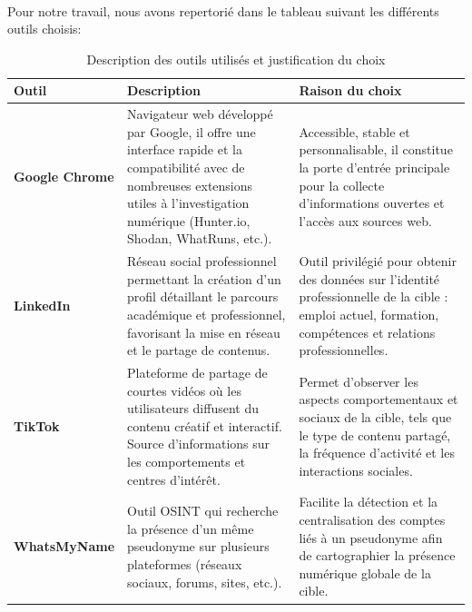 \documentclass[memoire,12pt]{report}
\begin{document}
\paragraph{}Pour notre travail, nous avons repertorié dans le tableau suivant les différents outils choisis:
\begin{table}[H]
\centering
\renewcommand{\arraystretch}{1.4} %
\setlength{\tabcolsep}{6pt} %
\caption{Description des outils utilisés et justification du choix}
\begin{tabularx}{\textwidth}{|>{\centering\arraybackslash}m{2.8cm}|X|X|}
\hline
\textbf{Outil} & \textbf{Description} & \textbf{Raison du choix} \\
\hline

\textbf{Google Chrome} & 
Navigateur web développé par Google, il offre une interface rapide et la compatibilité avec de nombreuses extensions utiles à l’investigation numérique (Hunter.io, Shodan, WhatRuns, etc.). &
Accessible, stable et personnalisable, il constitue la porte d’entrée principale pour la collecte d’informations ouvertes et l’accès aux sources web. \\
\hline

\textbf{LinkedIn} &
Réseau social professionnel permettant la création d’un profil détaillant le parcours académique et professionnel, favorisant la mise en réseau et le partage de contenus. &
Outil privilégié pour obtenir des données sur l’identité professionnelle de la cible : emploi actuel, formation, compétences et relations professionnelles. \\
\hline

\textbf{TikTok} &
Plateforme de partage de courtes vidéos où les utilisateurs diffusent du contenu créatif et interactif. Source d’informations sur les comportements et centres d’intérêt. &
Permet d’observer les aspects comportementaux et sociaux de la cible, tels que le type de contenu partagé, la fréquence d’activité et les interactions sociales. \\
\hline

\textbf{WhatsMyName} &
Outil OSINT qui recherche la présence d’un même pseudonyme sur plusieurs plateformes (réseaux sociaux, forums, sites, etc.). &
Facilite la détection et la centralisation des comptes liés à un pseudonyme afin de cartographier la présence numérique globale de la cible. \\
\hline

\end{tabularx}
\end{table}
\end{document}
